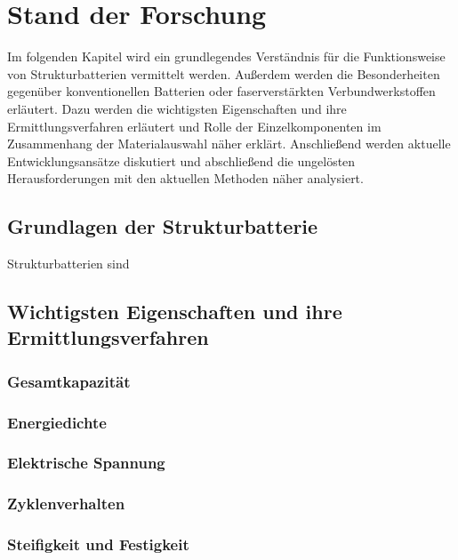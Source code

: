 \chapter{Stand der Forschung}

Im folgenden Kapitel wird ein grundlegendes Verständnis für die Funktionsweise von Strukturbatterien vermittelt werden. Außerdem werden die Besonderheiten gegenüber konventionellen Batterien oder faserverstärkten Verbundwerkstoffen erläutert. Dazu werden die wichtigsten Eigenschaften und ihre Ermittlungsverfahren erläutert und Rolle der Einzelkomponenten im Zusammenhang der Materialauswahl näher erklärt. Anschließend werden aktuelle Entwicklungsansätze diskutiert und abschließend die ungelösten Herausforderungen mit den aktuellen Methoden näher analysiert.

\section{Grundlagen der Strukturbatterie}
Strukturbatterien sind 

\section{Wichtigsten Eigenschaften und ihre Ermittlungsverfahren}
\subsection{Gesamtkapazität}
\subsection{Energiedichte}
\subsection{Elektrische Spannung}
\subsection{Zyklenverhalten}
\subsection{Steifigkeit und Festigkeit}
